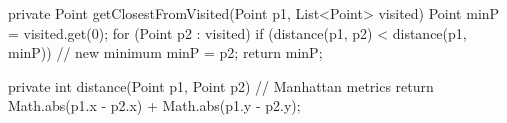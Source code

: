 private Point getClosestFromVisited(Point p1, List<Point> visited) {
	Point minP = visited.get(0);
	for (Point p2 : visited) {
		if (distance(p1, p2) < distance(p1, minP)) // new minimum
			minP = p2;
	}
	return minP;
}

private int distance(Point p1, Point p2) {
	// Manhattan metrics
	return Math.abs(p1.x - p2.x) + Math.abs(p1.y - p2.y);
}